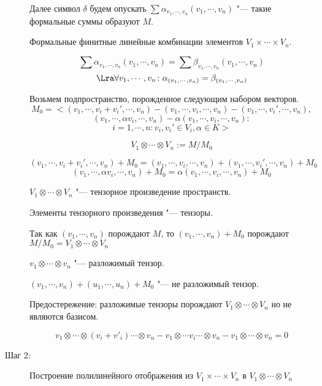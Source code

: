 \begin{description}
    Далее символ $\delta$ будем опускать $\sum \alpha_{v_1, \cdots, v_n}(v_1, \cdots, v_n)$ "--- такие формальные суммы образуют $M$.

    Формальные финитные линейные комбинации элементов $V_1 \times \cdots \times V_n$.

    $$\sum \alpha_{v_1, \cdots, v_n}(v_1, \cdots, v_n) = \sum \beta_{v_1, \cdots, v_n}(v_1, \cdots, v_n)$$ 
    $$\Lra \forall v_1, \cdots, v_n \colon \alpha_{(v_1, \cdots,  v_n)} = \beta_{(v_1, \cdots, v_n)}$$

    Возьмем подпространство, порожденное следующим набором векторов. 
    $$M_0 = <(v_1, \cdots, v_i + v_i', \cdots, v_n) - (v_1, \cdots, v_i, \cdots, v_n) - (v_1, \cdots, v_i', \cdots, v_n), $$
    $$       (v_1, \cdots, \alpha v_i, \cdots, v_n) - \alpha(v_1,\cdots, v_i, \cdots, v_n)\colon  $$
    $$ i = 1, \cdots, n \colon v_i, v_i' \in V_i, \alpha \in K>$$

    $$V_1 \otimes \cdots \otimes V_n := M/M_0$$
    
    \begin{Rem}
    $$(v_1, \cdots, v_i + v_i', \cdots, v_n) + M_0 = (v_1, \cdots, v_i, \cdots, v_n) + (v_1, \cdots, v_i',\cdots, v_n) + M_0$$
    $$(v_1, \cdots, \alpha v_i, \cdots, v_n) + M_0 = \alpha(v_1,\cdots, v_i, \cdots, v_n) + M_0$$
    \end{Rem}
    \begin{Def}
    $V_1 \otimes \cdots \otimes V_n$ "--- тензорное произведение пространств. 

    Элементы тензорного произведения "--- тензоры. 

    Так как  $(v_1, \cdots, v_n)$ порождают $M$,
    то $(v_1,\cdots, v_n) + M_0$ порождают $M/M_0 = V_1 \otimes \cdots \otimes V_n$
    
    $v_1 \otimes \cdots \otimes v_n$ "--- разложимый тензор. 
    \end{Def}
   
    $(v_1, \cdots, v_n) + (u_1, \cdots, u_n) + M_0$ "--- не разложимый тензор. 

    Предостережение: разложимые тензоры порождают $V_1 \otimes \cdots \otimes V_n$ 
    но не являются базисом.

    $$v_1 \otimes \cdots \otimes (v_i + v'_i) \cdots \otimes v_n - v_1 \otimes \cdots v_i \cdots \otimes v_n - v_1 \otimes \cdots \otimes v_n = 0$$
    \item[Шаг 2:] Построение полилинейного отображения из $V_1 \times \cdots \times V_n$ в $V_1 \otimes \cdots \otimes V_n$


\end{description}
